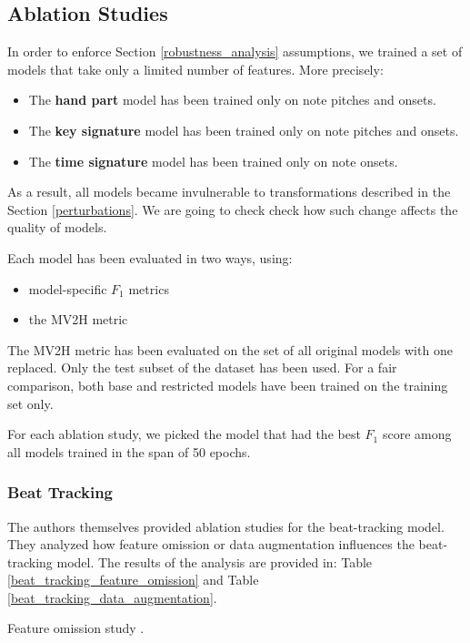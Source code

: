 \subsection{Ablation Studies} \label{ablation_studies}

In order to enforce Section \ref{robustness_analysis} assumptions, we trained a set of models that take only a limited number of features. More precisely: \begin{itemize}
	\item The \textbf{hand part} model has been trained only on note pitches and onsets.
	\item The \textbf{key signature} model has been trained only on note pitches and onsets.
	\item The \textbf{time signature} model has been trained only on note onsets.
\end{itemize}

As a result, all models became invulnerable to transformations described in the Section \ref{perturbations}. We are going to check check how such change affects the quality of models. 

Each model has been evaluated in two ways, using: \begin{itemize}
	\item model-specific $F_1$ metrics
	\item the MV2H metric
\end{itemize}

The MV2H metric has been evaluated on the set of all original models with one replaced. Only the test subset of the dataset has been used. For a fair comparison, both base and restricted models have been trained on the training set only.

For each ablation study, we picked the model that had the best $F_1$ score among all models trained in the span of 50 epochs.

\subsubsection{Beat Tracking} \label{beat_tracking}

The authors themselves provided ablation studies for the beat-tracking model. They analyzed how feature omission or data augmentation influences the beat-tracking model. The results of the analysis are provided in: Table \ref{beat_tracking_feature_omission} and Table \ref{beat_tracking_data_augmentation}.

\begin{table}[ht!]
\centering

\caption[Feature omission study.]{Feature omission study \cite{Liu2022}.}
\label{beat_tracking_feature_omission}
\end{table}

